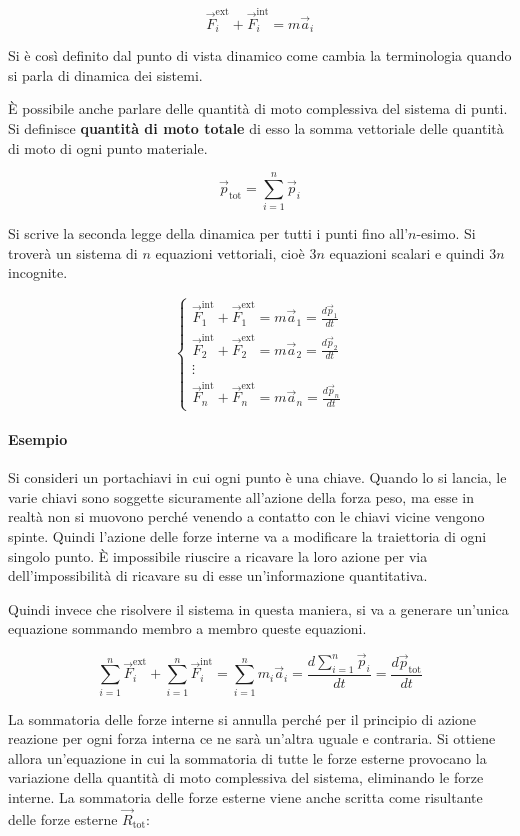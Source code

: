 \[
	\vec{F}_i^\text{ext}+\vec{F}_i^\text{int}=m\vec{a}_i
\]

Si è così definito dal punto di vista dinamico come cambia la terminologia quando si parla di dinamica dei sistemi.

È possibile anche parlare delle quantità di moto complessiva del sistema di punti. Si definisce \textbf{quantità di moto totale} di esso la somma vettoriale delle quantità di moto di ogni punto materiale.

\[
	\vec{p}_\text{tot}=\sum_{i=1}^n \vec{p}_i
\]

Si scrive la seconda legge della dinamica per tutti i punti fino all'$n$-esimo. Si troverà un sistema di $n$ equazioni vettoriali, cioè $3n$ equazioni scalari e quindi $3n$ incognite.

\[
	\begin{cases}
		\vec{F}_1^\text{int} + \vec{F}_1^\text{ext}=m\vec{a}_1=\frac{d\vec{p}_1}{dt} \\
		\vec{F}_2^\text{int} + \vec{F}_2^\text{ext}=m\vec{a}_2=\frac{d\vec{p}_2}{dt} \\
		\vdots \\
		\vec{F}_n^\text{int} + \vec{F}_n^\text{ext}=m\vec{a}_n=\frac{d\vec{p}_n}{dt}
	\end{cases}
\]

\paragraph{Esempio} Si consideri un portachiavi in cui ogni punto è una chiave. Quando lo si lancia, le varie chiavi sono soggette sicuramente all'azione della forza peso, ma esse in realtà non si muovono perché venendo a contatto con le chiavi vicine vengono spinte. Quindi l'azione delle forze interne va a modificare la traiettoria di ogni singolo punto. È impossibile riuscire a ricavare la loro azione per via dell'impossibilità di ricavare su di esse un'informazione quantitativa.

Quindi invece che risolvere il sistema in questa maniera, si va a generare un'unica equazione sommando membro a membro queste equazioni.

\[
	\sum_{i=1}^n \vec{F}_i^\text{ext}+\sum_{i=1}^n \vec{F}_i^\text{int}=\sum_{i=1}^nm_i\vec{a}_i=\frac{d\sum_{i=1}^n\vec{p}_i}{dt}=\frac{d\vec{p}_\text{tot}}{dt}
\]

La sommatoria delle forze interne si annulla perché per il principio di azione reazione per ogni forza interna ce ne sarà un'altra uguale e contraria. Si ottiene allora un'equazione in cui la sommatoria di tutte le forze esterne provocano la variazione della quantità di moto complessiva del sistema, eliminando le forze interne. La sommatoria delle forze esterne viene anche scritta come risultante delle forze esterne $\vec{R}_\text{tot}$:

